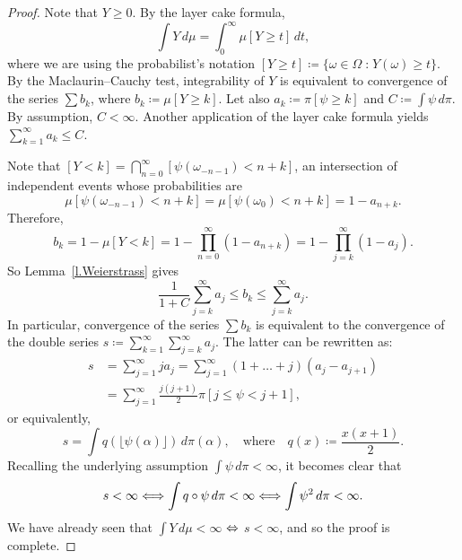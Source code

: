 \documentclass[AHL,Unicode,longabstracts,published]{cedram}
\newcommand{\st}{\;\mathord{:}\;}
\let\oldLeftrightarrow\Leftrightarrow
\renewcommand*{\Leftrightarrow}{\mathchoice{\Longleftrightarrow}{\oldLeftrightarrow}{\oldLeftrightarrow}{\oldLeftrightarrow}}
\begin{document}
\begin{proof}
Note that $Y \ge 0$. By the layer cake formula,
\begin{equation}
\int Y \, d\mu = \int_0^\infty \mu [Y \ge t] \, dt,
\end{equation}
where we are using the probabilist's notation $[Y \ge t] \coloneqq \{\omega \in \Omega \st Y(\omega) \ge t \}$. By the Maclaurin--Cauchy test, integrability of $Y$ is equivalent to convergence of the series $\sum b_k$, where $b_k \coloneqq \mu[Y \ge k]$. Let also $a_k \coloneqq \pi[\psi \ge k]$ and $C \coloneqq \int \psi \, d\pi$. By assumption, $C<\infty$. Another application of the layer cake formula yields $\sum_{k=1}^\infty a_k \le C$.

Note that $[Y < k] = \bigcap_{n=0}^\infty [\psi(\omega_{-n-1})<n+k]$, an intersection of independent events whose probabilities are
\begin{equation}
\mu[\psi(\omega_{-n-1})<n+k] = \mu[\psi(\omega_0)<n+k] = 1 - a_{n+k}.
\end{equation}
Therefore,
\begin{equation}
b_k = 1 - \mu[Y<k] = 1 - \prod_{n=0}^\infty (1 - a_{n+k}) = 1 - \prod_{j=k}^\infty (1-a_j).
\end{equation}
So Lemma~\ref{l.Weierstrass} gives
\begin{equation}
\frac{1}{1+C} \sum_{j=k}^\infty a_j \le b_k \le \sum_{j=k}^\infty a_j.
\end{equation}
In particular, convergence of the series $\sum b_k$ is equivalent to the convergence of the double series $s \coloneqq \sum_{k=1}^\infty\sum_{j=k}^\infty a_j$. The latter can be rewritten as:
\begin{equation}
\begin{split}
s &= \sum_{j=1}^\infty j a_j = \sum_{j=1}^\infty (1+\dots+j) (a_j - a_{j+1}) \\
&= \sum_{j=1}^\infty \frac{j(j+1)}{2} \pi[j \le \psi < j+1],
\end{split}
\end{equation}
or equivalently,
\begin{equation}
s = \int q (\lfloor\psi(\alpha) \rfloor ) \, d\pi(\alpha), \quad \text{where} \quad q(x) \coloneqq \frac{x(x+1)}{2}.
\end{equation}
Recalling the underlying assumption $\int \psi \, d\pi < \infty$, it becomes clear that
\begin{equation}
s < \infty  \Leftrightarrow 
\int q \circ \psi \, d\pi < \infty \Leftrightarrow
\int \psi^2 \, d\pi < \infty.
\end{equation}
We have already seen that $\int Y \, d\mu < \infty$ $\Leftrightarrow$ $s<\infty$, and so the proof is complete.
\end{proof}
\end{document}
